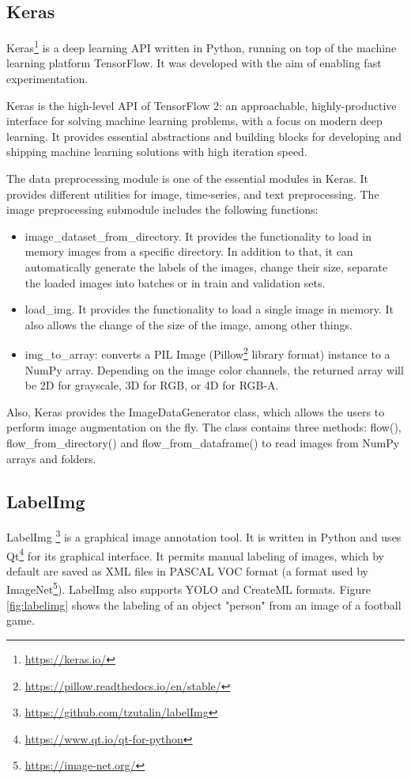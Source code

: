 \subsection{Keras}
\label{Keras}

Keras\footnote{\href{https://keras.io/}{https://keras.io/}} is a deep learning API written in Python, running on top of the machine learning platform TensorFlow. It was developed with the aim of enabling fast experimentation.

Keras is the high-level API of TensorFlow 2: an approachable, highly-productive interface for solving machine learning problems, with a focus on modern deep learning. It provides essential abstractions and building blocks for developing and shipping machine learning solutions with high iteration speed.

The data preprocessing module is one of the essential modules in Keras. It provides different utilities for image, time-series, and text preprocessing. The image preprocessing submodule includes the following functions:

\begin{itemize}
  \item image\_dataset\_from\_directory. It provides the functionality to load in memory images from a specific directory. In addition to that, it can automatically generate the labels of the images, change their size, separate the loaded images into batches or in train and validation sets.
  \item load\_img. It provides the functionality to load a single image in memory. It also allows the change of the size of the image, among other things.
  \item img\_to\_array: converts a PIL Image (Pillow\footnote{\href{https://pillow.readthedocs.io/en/stable/}{https://pillow.readthedocs.io/en/stable/}} library format) instance to a NumPy array. Depending on the image color channels, the returned array will be 2D for grayscale, 3D for RGB, or 4D for RGB-A.
\end{itemize}

Also, Keras provides the ImageDataGenerator class, which allows the users to perform image augmentation on the fly. The class contains three methods: flow(), flow\_from\_directory() and flow\_from\_dataframe() to read images from NumPy arrays and folders.

\subsection{LabelImg}
\label{LabelImg}
LabelImg \footnote{\href{https://github.com/tzutalin/labelImg}{https://github.com/tzutalin/labelImg}} is a graphical image annotation tool. It is written in Python and uses Qt\footnote{\href{https://www.qt.io/qt-for-python}{https://www.qt.io/qt-for-python}} for its graphical interface. It permits manual labeling of images, which by default are saved as XML files in PASCAL VOC format (a format used by ImageNet\footnote{\href{https://image-net.org/}{https://image-net.org/}}). LabelImg also supports YOLO and CreateML formats. Figure \ref{fig:labelimg} shows the labeling of an object "person" from an image of a football game.

